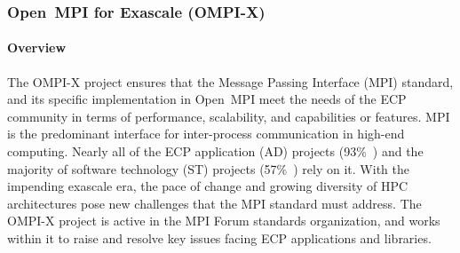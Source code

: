 \subsubsection{ Open~MPI for Exascale (OMPI-X)}\label{subsubsect:openmpi}



\paragraph{Overview}

The OMPI-X project ensures that the Message Passing Interface (MPI)
standard, and its specific implementation in Open~MPI meet the needs
of the ECP community in terms of performance, scalability, and
capabilities or features. MPI is the predominant interface for
inter-process communication in high-end computing.  Nearly all of the
ECP application (AD) projects (93\%~\cite{Bernholdt:2018:SMU-tr})
and the majority of software technology (ST) projects
(57\%~\cite{Bernholdt:2018:SMU-tr}) rely on it.
With the impending exascale era, the
pace of change and growing diversity of HPC architectures pose new
challenges that the MPI standard must address.  The OMPI-X project is
active in the MPI Forum standards organization, and works within it to
raise and resolve key issues facing ECP applications and libraries.

